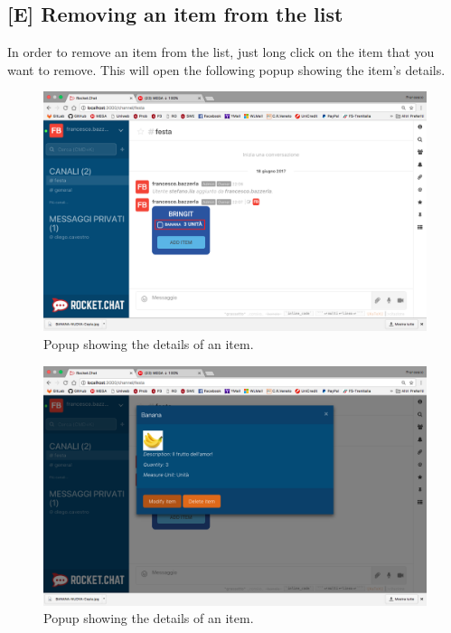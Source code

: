 \newpage
\subsection{[E] Removing an item from the list}
In order to remove an item from the list, just long click on the item that you want to remove. This will open the following popup showing the item's details.

\begin{figure}[H]
  \centering 
  \includegraphics[width=\textwidth]{Sections/3-HowToUse/Images/bubble_item_to_delete.png}
  \caption{Popup showing the details of an item.}
\end{figure}

\begin{figure}[H]
  \centering 
  \includegraphics[width=\textwidth]{Sections/3-HowToUse/Images/item_details.png}
  \caption{Popup showing the details of an item.}
\end{figure}

